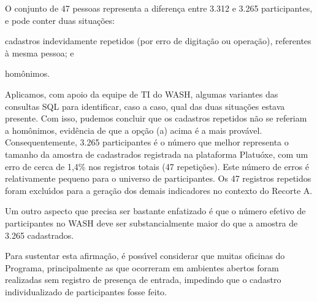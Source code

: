 \documentclass[
12pt,		%
openright,	%
twoside,  %
a4paper,			%
chapter=TITLE,		%
english,			%
french,				%
spanish,			%
brazil				%
]{USPSC-classe/USPSC}
\begin{document}
O conjunto de 47 pessoas representa a diferen\c{c}a entre 3.312 e 3.265 participantes, e pode conter duas situa\c{c}\~oes:










\begin{alineas}
\item cadastros indevidamente repetidos (por erro de digita\c{c}\~ao ou opera\c{c}\~ao), referentes \`a mesma pessoa; e
\item hom\^onimos.
\end{alineas}

Aplicamos, com apoio da equipe de TI do WASH, algumas variantes das consultas SQL para identificar, caso a caso, qual das duas situa\c{c}\~oes estava presente. Com isso, pudemos concluir que os cadastros repetidos n\~ao se referiam a hom\^onimos, evid\^encia de que a op\c{c}\~ao (a) acima \'e a mais prov\'avel. Consequentemente, 3.265 participantes \'e o n\'umero que melhor representa o tamanho da amostra de cadastrados registrada na plataforma Platu\'oxe,  com um erro de cerca de 1,4\% nos registros totais (47 repeti\c{c}\~oes). Este n\'umero de erros \'e relativamente pequeno para o universo de participantes. Os 47 registros repetidos foram exclu\'{\i}dos para a gera\c{c}\~ao dos demais indicadores no contexto do Recorte A.










\noindent\begin{center}\mbox{\centering{}}\end{center}


Um outro aspecto que precisa ser bastante enfatizado \'e que o n\'umero efetivo de participantes no WASH deve ser substancialmente maior do que a amostra de 3.265 cadastrados.









Para sustentar esta afirma\c{c}\~ao, \'e poss\'{\i}vel considerar que muitas oficinas do Programa, principalmente as que ocorreram em ambientes abertos foram realizadas sem registro de presen\c{c}a  de entrada, impedindo que o cadastro individualizado de participantes fosse feito.
\end{document}
